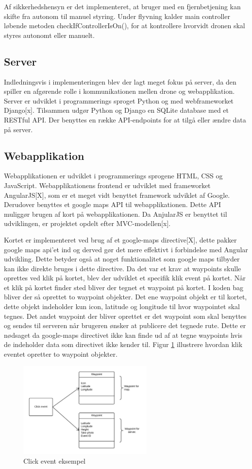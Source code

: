 Af sikkerhedshensyn er det implementeret, at bruger med en fjernbetjening kan skifte fra autonom til manuel styring. Under flyvning kalder main controller løbende metoden checkIfControllerIsOn(), for at kontrollere hvorvidt dronen skal styres autonomt eller manuelt.  

\subsection{Server}
Indledningsvis i implementeringen blev der lagt meget fokus på server, da den spiller en afgørende rolle i kommunikationen mellen drone og webapplikation. 
Server er udviklet i programmerings sproget Python og med webframeworket Django[x].
Tilsammen udgør Python og Django en SQLite database med et RESTful API. Der benyttes en række API-endpoints for at tilgå eller ændre data på server.

\subsection{Webapplikation}
Webapplikationen  er udviklet i programmerings sprogene HTML, CSS og JavaScript. Webapplikationens frontend er udviklet med frameworket AngularJS[X], som er et meget vidt benyttet framework udviklet af Google. Derudover benyttes et google maps API til webapplikationen. Dette API muliggør brugen af kort på webapplikationen. Da AnjularJS er benyttet til udviklingen, er projektet opdelt efter MVC-modellen[x]. 

Kortet er implementeret ved brug af et google-maps directive[X], dette pakker google maps api'et ind og derved gør det mere effektivt i forbindelse med Angular udvikling. Dette betyder også at noget funktionalitet som google maps tilbyder kan ikke direkte bruges i dette directive. 
Da det var et krav at waypoints skulle oprettes ved klik på kortet, blev der udviklet et specifik klik event på kortet. Når et klik på kortet finder sted bliver der tegnet et waypoint på kortet. I koden bag bliver der så oprettet to waypoint objekter. Det ene waypoint objekt er til kortet, dette objekt indeholder kun icon, latitude og longitude til hvor waypointet skal tegnes. Det andet waypoint der bliver oprettet er det waypoint som skal benyttes og sendes til serveren når brugeren ønsker at publicere det tegnede rute. Dette er nødsaget da google-maps directivet ikke kan finde ud af at tegne waypoints hvis de indeholder data som directivet ikke kender til. Figur \ref{fig:click_event} illustrere hvordan klik eventet opretter to waypoint objekter.

\vspace{-5pt}
\begin{figure}[H]
	\centering
	\includegraphics[width=0.6\textwidth]{Billeder/click_event.png}
	\vspace{-5pt}
	\caption{Click event eksempel}
	\label{fig:click_event}
\end{figure}

